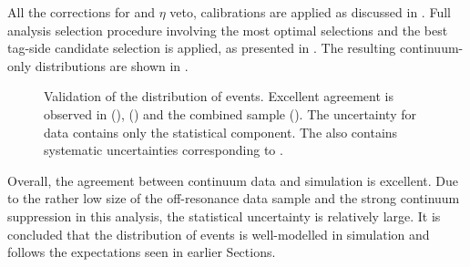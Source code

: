 All the corrections for \piz and $\eta$ veto, \FEI calibrations are applied as discussed in .
Full analysis selection procedure involving the most optimal selections and the best tag-side candidate selection is applied, as presented in .
The resulting continuum-only \EB distributions are shown in .
\begin{figure}[htbp!]
    \caption{\label{fig:offresonance_validation} Validation of the \EB distribution of \epem\ra\qqbar events.
    Excellent agreement is observed in \feiBp (), \feiBz ()
    and the combined sample ().
    The uncertainty for data contains only the statistical component.
    The \MC also contains systematic uncertainties corresponding to .
    }
\end{figure}

Overall, the agreement between continuum data and simulation is excellent.
Due to the rather low size of the off-resonance data sample and the strong continuum suppression in this analysis, the statistical uncertainty is relatively large.
It is concluded that the \EB distribution of \epem\ra\qqbar events is well-modelled in simulation and follows the expectations seen in earlier Sections.

